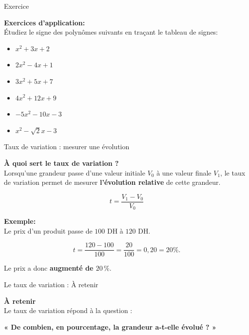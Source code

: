 \documentclass[aspectratio=169,11pt]{beamer}
\begin{document}
	\begin{frame}{Exercice}
		\begin{applicationbox}
			\textbf{Exercices d'application:} \\
			Étudiez le signe des polynômes suivants en traçant le tableau de signes:
			\begin{itemize}
				\item $ x^2+3 x+2$  \\
				\item $ 2 x^2-4 x+1$  \\
				\item $ 3 x^2+5 x+7$  \\
				\item $ 4 x^2+12 x+9$  \\
				\item $-5 x^2-10 x-3$  \\
				\item $ x^2-\sqrt{2} x-3 $
			\end{itemize}
			
		\end{applicationbox}
	\end{frame}
	\begin{frame}{Taux de variation : mesurer une évolution}
		
		\textbf{\color{blue}À quoi sert le taux de variation ?} \\
		
		Lorsqu'une grandeur passe d'une valeur initiale $V_0$ à une valeur
		finale $V_1$, le taux de variation permet de mesurer
		\textbf{l'évolution relative} de cette grandeur.
		
		\[
		\boxed{
			t=\frac{V_1-V_0}{V_0}
		}
		\]
		
		\begin{applicationbox}
			\textbf{Exemple:} \\
			Le prix d'un produit passe de $100$ DH à $120$ DH.
			
			\[
			t=\frac{120-100}{100}
			=\frac{20}{100}
			=0{,}20=20\%.
			\]
			
			Le prix a donc \textbf{augmenté de $20\,\%$}.
		\end{applicationbox}
		
		
		
	\end{frame}
	
	\begin{frame}{Le taux de variation : À retenir}
		
		\begin{applicationbox}
			\textbf{ \color{red}À retenir} \\
			
			Le taux de variation répond à la question :
			
			\begin{center}
				\textbf{« De combien, en pourcentage, la grandeur a-t-elle évolué ? »}
			\end{center}
		\end{applicationbox}
		
	\end{frame}
	
\end{document}
